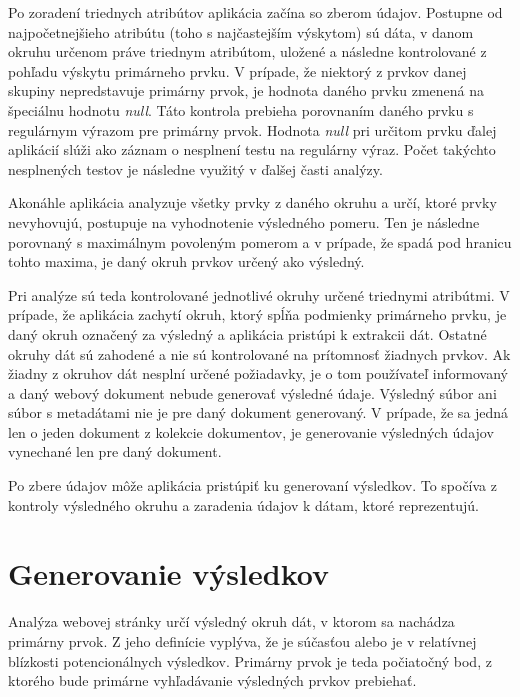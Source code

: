 Po zoradení triednych atribútov aplikácia začína so zberom údajov. Postupne od najpočetnejšieho atribútu (toho s najčastejším výskytom) sú dáta, v danom okruhu určenom práve triednym atribútom, uložené a následne kontrolované z pohľadu výskytu primárneho prvku. V prípade, že niektorý z prvkov danej skupiny nepredstavuje primárny prvok, je hodnota daného prvku zmenená na špeciálnu hodnotu \textit{null}. Táto kontrola prebieha porovnaním daného prvku s regulárnym výrazom pre primárny prvok. Hodnota \textit{null} pri určitom prvku ďalej aplikácií slúži ako záznam o nesplnení testu na regulárny výraz. Počet takýchto nesplnených testov je následne využitý v ďalšej časti analýzy.

Akonáhle aplikácia analyzuje všetky prvky z daného okruhu a určí, ktoré prvky nevyhovujú, postupuje na vyhodnotenie výsledného pomeru. Ten je následne porovnaný s maximálnym povoleným pomerom a v prípade, že spadá pod hranicu tohto maxima, je daný okruh prvkov určený ako výsledný.

\bigskip

Pri analýze sú teda kontrolované jednotlivé okruhy určené triednymi atribútmi. V prípade, že aplikácia zachytí okruh, ktorý spĺňa podmienky primárneho prvku, je daný okruh označený za výsledný a aplikácia pristúpi k extrakcii dát. Ostatné okruhy dát sú zahodené a nie sú kontrolované na prítomnosť žiadnych prvkov. Ak žiadny z okruhov dát nesplní určené požiadavky, je o tom používateľ informovaný a daný webový dokument nebude generovať výsledné údaje. Výsledný súbor ani súbor s metadátami nie je pre daný dokument generovaný. V prípade, že sa jedná len o jeden dokument z kolekcie dokumentov, je generovanie výsledných údajov vynechané len pre daný dokument.

Po zbere údajov môže aplikácia pristúpiť ku generovaní výsledkov. To spočíva z kontroly výsledného okruhu a zaradenia údajov k dátam, ktoré reprezentujú.

\newpage

\section{Generovanie výsledkov}

Analýza webovej stránky určí výsledný okruh dát, v ktorom sa nachádza primárny prvok. Z jeho definície vyplýva, že je súčasťou alebo je v relatívnej blízkosti potencionálnych výsledkov. Primárny prvok je teda počiatočný bod, z ktorého bude primárne vyhľadávanie výsledných prvkov prebiehať. 

